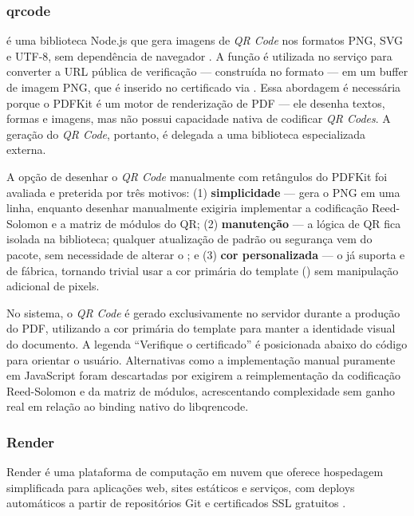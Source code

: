 \subsubsection{qrcode}
\label{sec:qrcode}

 é uma biblioteca Node.js que gera imagens de \textit{QR Code} nos formatos PNG, SVG e UTF-8, sem dependência de navegador \cite{qrcode2025}. A função  é utilizada no serviço  para converter a URL pública de verificação --- construída no formato  --- em um buffer de imagem PNG, que é inserido no certificado via . Essa abordagem é necessária porque o PDFKit é um motor de renderização de PDF --- ele desenha textos, formas e imagens, mas não possui capacidade nativa de codificar \textit{QR Codes}. A geração do \textit{QR Code}, portanto, é delegada a uma biblioteca especializada externa.

A opção de desenhar o \textit{QR Code} manualmente com retângulos do PDFKit foi avaliada e preterida por três motivos: (1) \textbf{simplicidade} ---  gera o PNG em uma linha, enquanto desenhar manualmente exigiria implementar a codificação Reed-Solomon e a matriz de módulos do QR; (2) \textbf{manutenção} --- a lógica de QR fica isolada na biblioteca; qualquer atualização de padrão ou segurança vem do pacote, sem necessidade de alterar o ; e (3) \textbf{cor personalizada} --- o  já suporta  e  de fábrica, tornando trivial usar a cor primária do template () sem manipulação adicional de pixels.

No sistema, o \textit{QR Code} é gerado exclusivamente no servidor durante a produção do PDF, utilizando a cor primária do template para manter a identidade visual do documento. A legenda ``Verifique o certificado'' é posicionada abaixo do código para orientar o usuário. Alternativas como a implementação manual puramente em JavaScript foram descartadas por exigirem a reimplementação da codificação Reed-Solomon e da matriz de módulos, acrescentando complexidade sem ganho real em relação ao binding nativo do libqrencode.

\label{sec:infra}

\subsubsection{Render}
Render é uma plataforma de computação em nuvem que oferece hospedagem simplificada para aplicações web, sites estáticos e serviços, com deploys automáticos a partir de repositórios Git e certificados SSL gratuitos \cite{render2025}.

